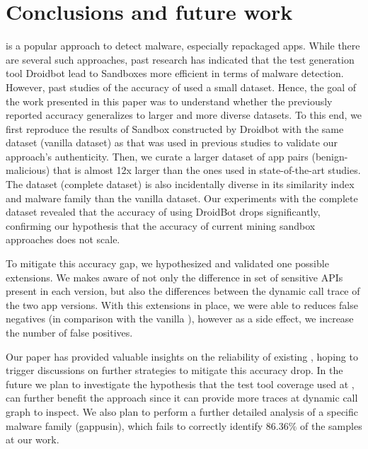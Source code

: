 \section{Conclusions and future work}\label{sec:conclusions}

\mas is a popular approach to detect malware, especially repackaged apps. While there are several such approaches, past research has indicated that the test generation tool Droidbot lead to Sandboxes more efficient in terms of malware detection. However, past studies of the accuracy of \mas used a small dataset. Hence, the goal of the work presented in this paper was to understand whether the previously reported accuracy generalizes to larger and more diverse datasets. To this end, we first reproduce the results of Sandbox constructed by Droidbot with the same dataset (vanilla dataset) as that was used in previous studies to validate our approach's authenticity. Then, we curate a larger dataset of app pairs (benign-malicious) that is almost 12x larger than the ones used in state-of-the-art studies. The dataset (complete dataset) is also incidentally diverse in its similarity index and malware family than the vanilla dataset. Our experiments with the complete dataset revealed that the accuracy of \mas using DroidBot drops significantly, confirming our hypothesis that the accuracy of current mining sandbox approaches does not scale.
      
To mitigate this accuracy gap, we hypothesized and validated one possible extensions. We makes \mas aware of not only the difference in set of sensitive APIs present in each version, but also the differences between the dynamic call trace of the two app versions. With this extensions in place, we were able to reduces false negatives (in comparison
with the vanilla \mas), however as a side effect, we increase the number of false positives.

Our paper has provided valuable insights on the reliability of existing \mas, hoping to trigger discussions on further strategies to mitigate this accuracy drop. In the future we plan to investigate the hypothesis that the test tool coverage used at \mas, can further benefit the approach since it can provide more traces at dynamic call graph to inspect. We also plan to perform a further detailed analysis of a specific malware family (gappusin), which \mas fails to correctly identify $86.36\%$ of the samples at our work. 

